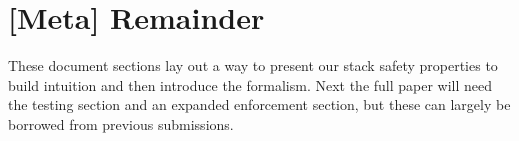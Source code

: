 \documentclass[10pt,conference]{ieeetran}%
\theoremstyle{definition}
\begin{document}

\section*{[Meta] Remainder}

These document sections lay out a way to present our stack safety properties to build intuition and
then introduce the formalism. Next the full paper will need the testing section and an expanded
enforcement section, but these can largely be borrowed from previous submissions.



\end{document}
